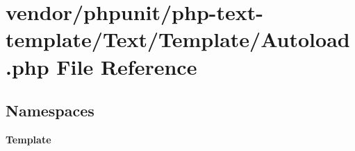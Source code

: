 \section{vendor/phpunit/php-\/text-\/template/\+Text/\+Template/\+Autoload.php File Reference}
\label{vendor_2phpunit_2php-text-template_2_text_2_template_2autoload_8php}
\subsection*{Namespaces}
\begin{DoxyCompactItemize}
\item 
 {\bf Template}
\end{DoxyCompactItemize}
